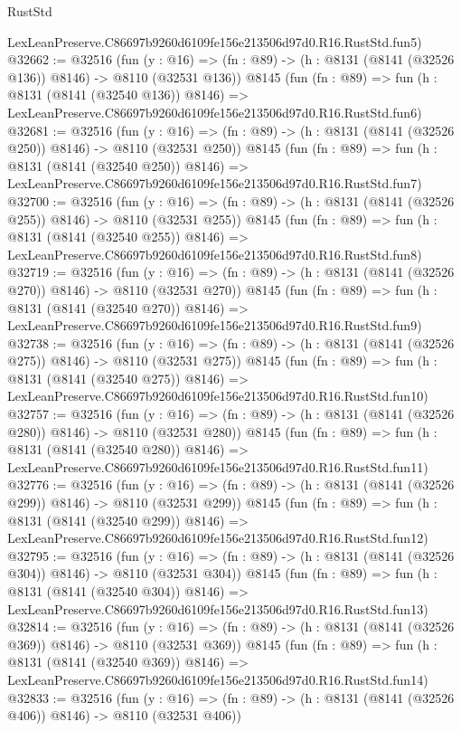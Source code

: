 \begin{lexlean}{RustStd}
\begin{coremodule}
    LexLeanPreserve.C86697b9260d6109fe156e213506d97d0.R16.RustStd.fun5)
@32662 := @32516
    (fun (y : @16) => (fn : @89) -> (h : @8131 (@8141 (@32526 @136)) @8146) -> @8110 (@32531 @136))
    @8145
    (fun (fn : @89) =>
    fun (h : @8131 (@8141 (@32540 @136)) @8146) =>
    LexLeanPreserve.C86697b9260d6109fe156e213506d97d0.R16.RustStd.fun6)
@32681 := @32516
    (fun (y : @16) => (fn : @89) -> (h : @8131 (@8141 (@32526 @250)) @8146) -> @8110 (@32531 @250))
    @8145
    (fun (fn : @89) =>
    fun (h : @8131 (@8141 (@32540 @250)) @8146) =>
    LexLeanPreserve.C86697b9260d6109fe156e213506d97d0.R16.RustStd.fun7)
@32700 := @32516
    (fun (y : @16) => (fn : @89) -> (h : @8131 (@8141 (@32526 @255)) @8146) -> @8110 (@32531 @255))
    @8145
    (fun (fn : @89) =>
    fun (h : @8131 (@8141 (@32540 @255)) @8146) =>
    LexLeanPreserve.C86697b9260d6109fe156e213506d97d0.R16.RustStd.fun8)
@32719 := @32516
    (fun (y : @16) => (fn : @89) -> (h : @8131 (@8141 (@32526 @270)) @8146) -> @8110 (@32531 @270))
    @8145
    (fun (fn : @89) =>
    fun (h : @8131 (@8141 (@32540 @270)) @8146) =>
    LexLeanPreserve.C86697b9260d6109fe156e213506d97d0.R16.RustStd.fun9)
@32738 := @32516
    (fun (y : @16) => (fn : @89) -> (h : @8131 (@8141 (@32526 @275)) @8146) -> @8110 (@32531 @275))
    @8145
    (fun (fn : @89) =>
    fun (h : @8131 (@8141 (@32540 @275)) @8146) =>
    LexLeanPreserve.C86697b9260d6109fe156e213506d97d0.R16.RustStd.fun10)
@32757 := @32516
    (fun (y : @16) => (fn : @89) -> (h : @8131 (@8141 (@32526 @280)) @8146) -> @8110 (@32531 @280))
    @8145
    (fun (fn : @89) =>
    fun (h : @8131 (@8141 (@32540 @280)) @8146) =>
    LexLeanPreserve.C86697b9260d6109fe156e213506d97d0.R16.RustStd.fun11)
@32776 := @32516
    (fun (y : @16) => (fn : @89) -> (h : @8131 (@8141 (@32526 @299)) @8146) -> @8110 (@32531 @299))
    @8145
    (fun (fn : @89) =>
    fun (h : @8131 (@8141 (@32540 @299)) @8146) =>
    LexLeanPreserve.C86697b9260d6109fe156e213506d97d0.R16.RustStd.fun12)
@32795 := @32516
    (fun (y : @16) => (fn : @89) -> (h : @8131 (@8141 (@32526 @304)) @8146) -> @8110 (@32531 @304))
    @8145
    (fun (fn : @89) =>
    fun (h : @8131 (@8141 (@32540 @304)) @8146) =>
    LexLeanPreserve.C86697b9260d6109fe156e213506d97d0.R16.RustStd.fun13)
@32814 := @32516
    (fun (y : @16) => (fn : @89) -> (h : @8131 (@8141 (@32526 @369)) @8146) -> @8110 (@32531 @369))
    @8145
    (fun (fn : @89) =>
    fun (h : @8131 (@8141 (@32540 @369)) @8146) =>
    LexLeanPreserve.C86697b9260d6109fe156e213506d97d0.R16.RustStd.fun14)
@32833 := @32516
    (fun (y : @16) => (fn : @89) -> (h : @8131 (@8141 (@32526 @406)) @8146) -> @8110 (@32531 @406))

\end{coremodule}
\end{lexlean}

